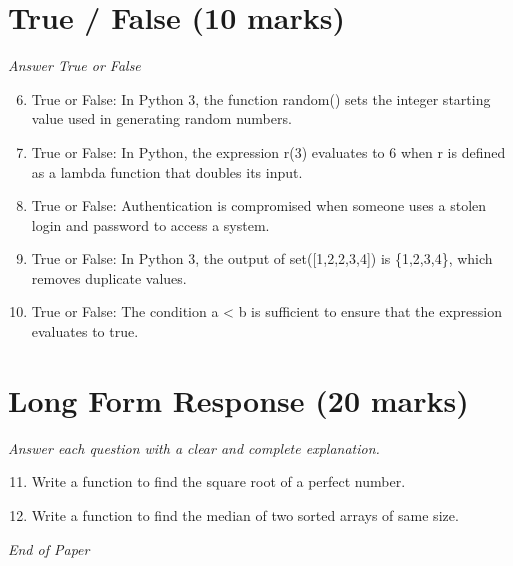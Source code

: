 \documentclass[12pt]{article}
\begin{document}
\section*{True / False (10 marks)}
\textit{Answer True or False}
\begin{enumerate}[label=\arabic*.]
\setcounter{enumi}{5}
\item True or False: In Python 3, the function random() sets the integer starting value used in generating random numbers.
\item True or False: In Python, the expression r(3) evaluates to 6 when r is defined as a lambda function that doubles its input.
\item True or False: Authentication is compromised when someone uses a stolen login and password to access a system.
\item True or False: In Python 3, the output of set([1,2,2,3,4]) is \{1,2,3,4\}, which removes duplicate values.
\item True or False: The condition a \textless{} b is sufficient to ensure that the expression evaluates to true.
\end{enumerate}

\section*{Long Form Response (20 marks)}
\textit{Answer each question with a clear and complete explanation.}
\begin{enumerate}[label=\arabic*.]
\setcounter{enumi}{10}
\item Write a function to find the square root of a perfect number.
\item Write a function to find the median of two sorted arrays of same size.
\end{enumerate}

\vfill
\noindent\textit{End of Paper}
\end{document}
